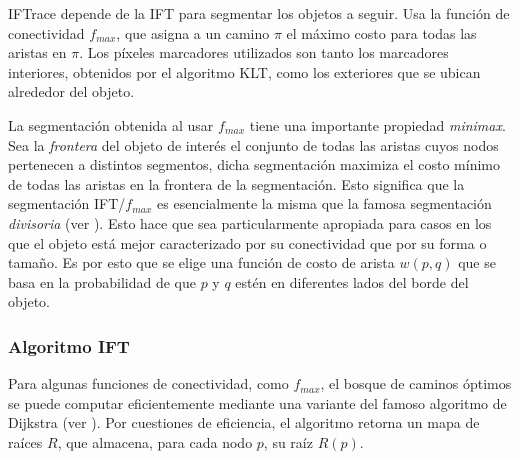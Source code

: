 \documentclass[a4paper,10pt]{article}
\begin{document}
IFTrace depende de la IFT para segmentar los objetos a seguir. Usa la función
de conectividad $f_{max}$, que asigna a un camino $\pi$ el máximo costo para
todas las aristas en $\pi$. Los píxeles marcadores utilizados son tanto los
marcadores interiores, obtenidos por el algoritmo KLT, como los exteriores que
se ubican alrededor del objeto.

La segmentación obtenida al usar $f_{max}$ tiene una importante propiedad
\textit{minimax}. Sea la \textit{frontera} del objeto de interés el conjunto de
todas las aristas cuyos nodos pertenecen a distintos segmentos, dicha
segmentación maximiza el costo mínimo de todas las aristas en la frontera de la
segmentación. Esto significa que la segmentación IFT/$f_{max}$ es esencialmente
la misma que la famosa segmentación \textit{divisoria} (ver
\cite{watershed-segmentation}). Esto hace que sea particularmente apropiada
para casos en los que el objeto está mejor caracterizado por su conectividad
que por su forma o tamaño. Es por esto que se elige una función de costo de
arista $w(p,q)$ que se basa en la probabilidad de que $p$ y $q$ estén en
diferentes lados del borde del objeto.

\subsubsection{Algoritmo IFT}

Para algunas funciones de conectividad, como $f_{max}$, el bosque de caminos
óptimos se puede computar eficientemente mediante una variante del famoso
algoritmo de Dijkstra (ver \cite{watershed-segmentation}). Por cuestiones de
eficiencia, el algoritmo retorna un mapa de raíces $R$, que almacena, para
cada nodo $p$, su raíz $R(p)$.\\
\end{document}
